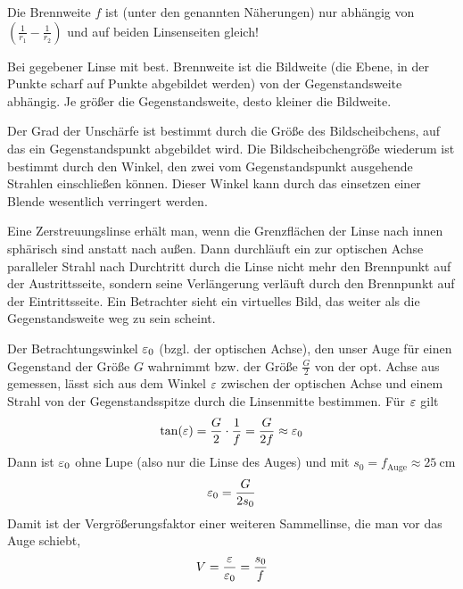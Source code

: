  Die Brennweite $f$ ist (unter den genannten Näherungen)
nur abhängig von $\left( \frac{1}{r_1}-\frac{1}{r_2} \right)$ und auf
beiden Linsenseiten gleich!

Bei gegebener Linse mit best. Brennweite ist die Bildweite (die Ebene,
in der Punkte scharf auf Punkte abgebildet werden) von der
Gegenstandsweite abhängig.
Je größer die Gegenstandsweite, desto kleiner die Bildweite.

Der Grad der Unschärfe ist bestimmt durch die Größe des
Bildscheibchens, auf das ein Gegenstandspunkt abgebildet wird. Die
Bildscheibchengröße wiederum ist bestimmt durch den Winkel, den zwei
vom Gegenstandspunkt ausgehende Strahlen einschließen können.
Dieser Winkel kann durch das einsetzen einer Blende wesentlich
verringert werden.

Eine Zerstreuungslinse erhält man, wenn die Grenzflächen der Linse
nach innen sphärisch sind anstatt nach außen.
Dann durchläuft ein zur optischen Achse paralleler Strahl nach
Durchtritt durch die Linse nicht mehr den Brennpunkt auf der Austrittsseite,
sondern seine Verlängerung verläuft durch den Brennpunkt auf der Eintrittsseite.
Ein Betrachter sieht ein virtuelles Bild, das weiter als die
Gegenstandsweite weg zu sein scheint.

Der Betrachtungswinkel $\varepsilon_0$ (bzgl. der optischen Achse), den unser
Auge für einen Gegenstand der Größe $G$ wahrnimmt
bzw. der Größe $\frac{G}{2}$ von der opt. Achse aus gemessen,
lässt sich aus dem Winkel $\varepsilon$ zwischen der optischen Achse und
einem Strahl von der Gegenstandsspitze durch die Linsenmitte
bestimmen.
Für $\varepsilon$ gilt
\begin{gather*}
  \tan(\varepsilon) = \frac{G}{2 }\cdot\frac{1}{f} =\frac{G}{2f} \approx
  \varepsilon_0
\end{gather*}
Dann ist $\varepsilon_0$ ohne Lupe (also nur die Linse des Auges) und mit
$s_0=f_\text{Auge}\approx \SI{25}{\centi\meter}$
\begin{gather*}
  \varepsilon_0 = \frac{G}{2 s_0}
\end{gather*}
Damit ist der Vergrößerungsfaktor einer weiteren Sammellinse, die man
vor das Auge schiebt,
\begin{gather*}
  V = \frac{\varepsilon}{\varepsilon_0} = \frac{s_0}{f}
\end{gather*}

